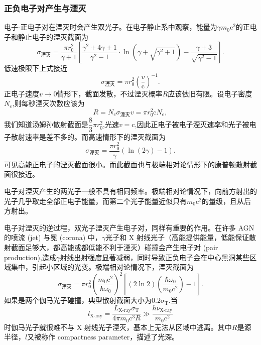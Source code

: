\documentclass[../天体物理基础.tex]{subfiles}
\begin{document}
\subsubsection{正负电子对产生与湮灭}
电子{}-{}正电子对在湮灭时会产生双光子。在电子静止系中观察，能量为$\gamma m_{0}\mathrm{c}^{2}$的正电子和静止电子的湮灭截面为
\begin{equation}
\sigma_{\text{湮灭}}=\frac{\pi r_{0}^{2}}{\gamma+1}\left[\frac{\gamma^{2}+4\gamma+1}{\gamma^{2}-1}\cdot \ln\left(\gamma+\sqrt{\gamma^{2}+1}\right)-\frac{\gamma+3}{\sqrt{\gamma^{2}-1}}\right].
\end{equation}
低速极限下上式接近
\begin{equation}
\sigma_{\text{湮灭}}=\pi r_{0}^{2}\left(\frac{v}{\mathrm{c}}\right)^{-1}.
\end{equation}
正电子速度$v\to0$情形下，截面发散，不过湮灭概率$R$应该依旧有限。设电子密度$N_{e}$,则每秒湮灭次数应该为
\begin{equation}
R=N_{e}\sigma_{\text{湮灭}}v=\pi r_{0}^{2}\mathrm{c}N_{e},
\end{equation}
我们知道汤姆孙散射截面是$\dfrac{8}{3}\pi r_{0}^{2}$,光速$v=\mathrm{c}$,因此正电子被电子湮灭速率和光子被电子散射速率是差不多的。而高速情形下的湮灭截面为
\begin{equation}
\sigma_{\text{湮灭}}=\frac{\pi r_{0}^{2}}{\gamma}\left(\ln\left(2\gamma\right)-1\right).
\end{equation}
可见高能正电子的湮灭截面很小。而此截面也与极端相对论情形下的康普顿散射截面很接近。

电子对湮灭产生的两光子一般不具有相同频率。极端相对论情况下，向前方射出的光子几乎取走全部正电子能量，而第二个光子能量近似只有$m_{0}\mathrm{c}^{2}$的量级，且从后方射出。

电子对湮灭的逆过程，双光子湮灭产生电子对，同样有重要的作用。在许多 AGN 的喷流 (jet) 与冕 (corona) 中，$\gamma$光子和 X 射线光子（高能提供能量，低能保证散射截面足够大，都高能或都低能不利于湮灭）碰撞会产生电子对 (pair production),造成$\gamma$射线出射强度显著减弱，同时导致正负电子会在中心黑洞某些区域集中，引起小区域的光变。极端相对论情况下，湮灭截面为
\begin{equation}
\sigma_{\text{湮灭}}=\pi r_{0}^{2}\left(\frac{m_{0}\mathrm{c}^{2}}{\hbar\omega_{0}}\right)^{2}\left[\left(2\ln2\right)\left(\frac{\hbar\omega_{0}}{m_{0}\mathrm{c}^{2}}\right)-1\right].
\end{equation}
如果是两个伽马光子碰撞，典型散射截面大小为$0.2\sigma_{\text{T}}$.当
\begin{equation}
l_{\text{X-ray}}=\frac{L_{\text{X-ray}}\sigma_{\text{T}}}{4\pi m_{0}\mathrm{c}^{3}R}\gg\frac{h\nu_{\text{X-ray}}}{m_{0}\mathrm{c}^{2}}
\end{equation}
时伽马光子就很难不与 X 射线光子湮灭，基本上无法从区域中逃离。其中$R$是源半径，$l$又被称作 compactness parameter，描述了光深。
\end{document}
